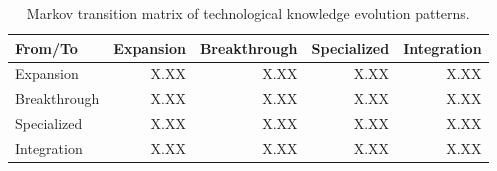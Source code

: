 
\begin{table}[t]
\centering
\caption{Markov transition matrix of technological knowledge evolution patterns.}
\begin{tabular}{lrrrr}
\toprule
From/To & Expansion & Breakthrough & Specialized & Integration\\
\midrule
Expansion & X.XX & X.XX & X.XX & X.XX\\
Breakthrough & X.XX & X.XX & X.XX & X.XX\\
Specialized & X.XX & X.XX & X.XX & X.XX\\
Integration & X.XX & X.XX & X.XX & X.XX\\
\bottomrule
\end{tabular}
\label{tab:markov}
\end{table}
